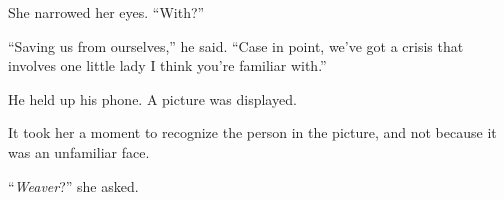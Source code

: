 She narrowed her eyes.  ``With?''



``Saving us from ourselves,'' he said.  ``Case in point, we've got a crisis that involves one little lady I think you're familiar with.''



He held up his phone.  A picture was displayed.



It took her a moment to recognize the person in the picture, and not because it was an unfamiliar face.



``\emph{Weaver}?'' she asked.





